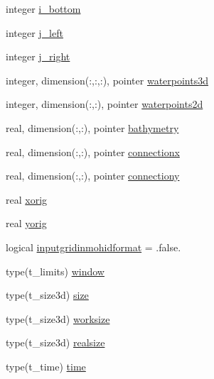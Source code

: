 \begin{DoxyCompactItemize}
\item 
integer \mbox{\hyperlink{structmodulehycomformat_1_1t__hycomformat_abbea1e73842936afc967e0308f6f5712}{i\+\_\+bottom}}
\item 
integer \mbox{\hyperlink{structmodulehycomformat_1_1t__hycomformat_a283b4a703df078de10e3a3471d7f19ac}{j\+\_\+left}}
\item 
integer \mbox{\hyperlink{structmodulehycomformat_1_1t__hycomformat_a59a00af2758b55ec075cd1e6d36f5795}{j\+\_\+right}}
\item 
integer, dimension(\+:,\+:,\+:), pointer \mbox{\hyperlink{structmodulehycomformat_1_1t__hycomformat_abce6b189f42949225d8707b8dde5b2fb}{waterpoints3d}}
\item 
integer, dimension(\+:,\+:), pointer \mbox{\hyperlink{structmodulehycomformat_1_1t__hycomformat_a63722eaf9abec5bdc8ddb4de377ab392}{waterpoints2d}}
\item 
real, dimension(\+:,\+:), pointer \mbox{\hyperlink{structmodulehycomformat_1_1t__hycomformat_a4293c568b5702d4fa4e35f797548eddc}{bathymetry}}
\item 
real, dimension(\+:,\+:), pointer \mbox{\hyperlink{structmodulehycomformat_1_1t__hycomformat_a88cb5d31c1c229e468380aa2a0b57b9e}{connectionx}}
\item 
real, dimension(\+:,\+:), pointer \mbox{\hyperlink{structmodulehycomformat_1_1t__hycomformat_a0ffbe711119d9b50238142f4344bc982}{connectiony}}
\item 
real \mbox{\hyperlink{structmodulehycomformat_1_1t__hycomformat_adc1111733c1afbe8ce52f429b0302197}{xorig}}
\item 
real \mbox{\hyperlink{structmodulehycomformat_1_1t__hycomformat_ac3e2fc4a2b2f20a9e3bb4ad2934e05d5}{yorig}}
\item 
logical \mbox{\hyperlink{structmodulehycomformat_1_1t__hycomformat_a7584e72265c44159c40315bed33fbb4b}{inputgridinmohidformat}} = .false.
\item 
type(t\+\_\+limits) \mbox{\hyperlink{structmodulehycomformat_1_1t__hycomformat_ab72613912b18bbe109e7b281201c0d22}{window}}
\item 
type(t\+\_\+size3d) \mbox{\hyperlink{structmodulehycomformat_1_1t__hycomformat_afdebedaba925249da6de5de649b6c417}{size}}
\item 
type(t\+\_\+size3d) \mbox{\hyperlink{structmodulehycomformat_1_1t__hycomformat_a8d32c68a8fd85082617f42d539167c2d}{worksize}}
\item 
type(t\+\_\+size3d) \mbox{\hyperlink{structmodulehycomformat_1_1t__hycomformat_af9c03904093379d5a89d4faf8cc4099a}{realsize}}
\item 
type(t\+\_\+time) \mbox{\hyperlink{structmodulehycomformat_1_1t__hycomformat_a275075aaf6424c8a79f5e8b6eb8cfecc}{time}}
\end{DoxyCompactItemize}


